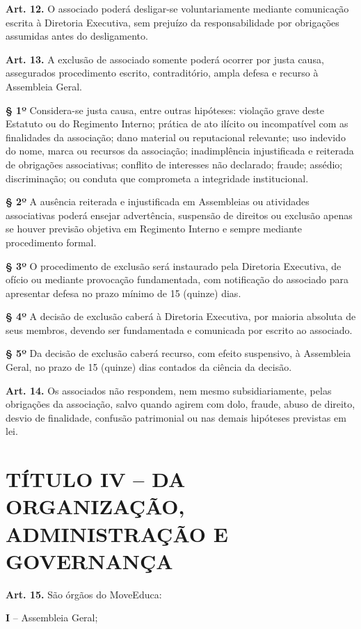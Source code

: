 \documentclass[11pt,a4paper]{article}
\begin{document}
\textbf{Art. 12.} O associado poderá desligar-se voluntariamente mediante comunicação escrita à Diretoria Executiva, sem prejuízo da responsabilidade por obrigações assumidas antes do desligamento.

\textbf{Art. 13.} A exclusão de associado somente poderá ocorrer por justa causa, assegurados procedimento escrito, contraditório, ampla defesa e recurso à Assembleia Geral.

\textbf{§ 1º} Considera-se justa causa, entre outras hipóteses: violação grave deste Estatuto ou do Regimento Interno; prática de ato ilícito ou incompatível com as finalidades da associação; dano material ou reputacional relevante; uso indevido do nome, marca ou recursos da associação; inadimplência injustificada e reiterada de obrigações associativas; conflito de interesses não declarado; fraude; assédio; discriminação; ou conduta que comprometa a integridade institucional.

\textbf{§ 2º} A ausência reiterada e injustificada em Assembleias ou atividades associativas poderá ensejar advertência, suspensão de direitos ou exclusão apenas se houver previsão objetiva em Regimento Interno e sempre mediante procedimento formal.

\textbf{§ 3º} O procedimento de exclusão será instaurado pela Diretoria Executiva, de ofício ou mediante provocação fundamentada, com notificação do associado para apresentar defesa no prazo mínimo de 15 (quinze) dias.

\textbf{§ 4º} A decisão de exclusão caberá à Diretoria Executiva, por maioria absoluta de seus membros, devendo ser fundamentada e comunicada por escrito ao associado.

\textbf{§ 5º} Da decisão de exclusão caberá recurso, com efeito suspensivo, à Assembleia Geral, no prazo de 15 (quinze) dias contados da ciência da decisão.

\textbf{Art. 14.} Os associados não respondem, nem mesmo subsidiariamente, pelas obrigações da associação, salvo quando agirem com dolo, fraude, abuso de direito, desvio de finalidade, confusão patrimonial ou nas demais hipóteses previstas em lei.

\section*{TÍTULO IV -- DA ORGANIZAÇÃO, ADMINISTRAÇÃO E GOVERNANÇA}

\textbf{Art. 15.} São órgãos do MoveEduca:

\textbf{I} -- Assembleia Geral;
\end{document}
